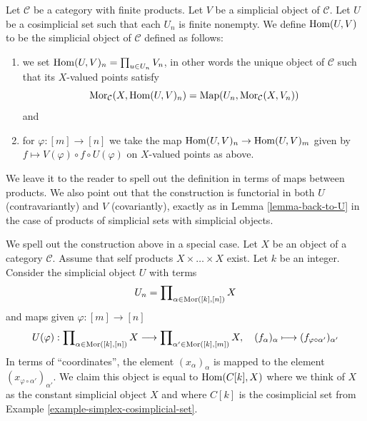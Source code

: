 \begin{definition}
\label{definition-hom-deltak-simplicial}
Let $\mathcal{C}$ be a category with finite products.
Let $V$ be a simplicial object of $\mathcal{C}$.
Let $U$ be a cosimplicial set such that each $U_n$ is finite nonempty.
We define {\it $\mathop{\mathrm{Hom}}\nolimits(U, V)$} to be
the simplicial object of $\mathcal{C}$ defined
as follows:
\begin{enumerate}
\item we set $\mathop{\mathrm{Hom}}\nolimits(U, V)_n = \prod_{u \in U_n} V_n$,
in other words the unique object of $\mathcal{C}$ such
that its $X$-valued points satisfy
$$
\mathop{\mathrm{Mor}}\nolimits_\mathcal{C}(X, \mathop{\mathrm{Hom}}\nolimits(U, V)_n)
=
\text{Map}(U_n, \mathop{\mathrm{Mor}}\nolimits_\mathcal{C}(X, V_n))
$$
and
\item for $\varphi : [m] \to [n]$ we take the map
$\mathop{\mathrm{Hom}}\nolimits(U, V)_n \to \mathop{\mathrm{Hom}}\nolimits(U, V)_m$
given by $f \mapsto V(\varphi) \circ f \circ U(\varphi)$
on $X$-valued points as above.
\end{enumerate}
\end{definition}

\noindent
We leave it to the reader to spell out the
definition in terms of maps between products.
We also point out that the construction is functorial
in both $U$ (contravariantly) and $V$ (covariantly), exactly as in
Lemma \ref{lemma-back-to-U} in the case of
products of simplicial sets with simplicial objects.

\medskip\noindent
We spell out the construction above in a special case.
Let $X$ be an object of a category $\mathcal{C}$.
Assume that self products $X \times \ldots \times X$ exist.
Let $k$ be an integer.
Consider the simplicial object $U$ with terms
$$
U_n = \prod\nolimits_{\alpha \in \mathop{\mathrm{Mor}}\nolimits([k], [n])} X
$$
and maps given $\varphi : [m] \to [n]$
$$
U(\varphi) :
\prod\nolimits_{\alpha \in \mathop{\mathrm{Mor}}\nolimits([k], [n])} X
\longrightarrow
\prod\nolimits_{\alpha' \in \mathop{\mathrm{Mor}}\nolimits([k], [m])} X, \quad
(f_{\alpha})_{\alpha} \longmapsto
(f_{\varphi \circ \alpha'})_{\alpha'}
$$
In terms of ``coordinates'', the element $(x_\alpha)_\alpha$
is mapped to the element $(x_{\varphi \circ \alpha'})_{\alpha'}$.
We claim this object is equal to $\mathop{\mathrm{Hom}}\nolimits(C[k], X)$
where we think of $X$ as the constant simplicial object $X$
and where $C[k]$ is the cosimplicial set from
Example \ref{example-simplex-cosimplicial-set}.

